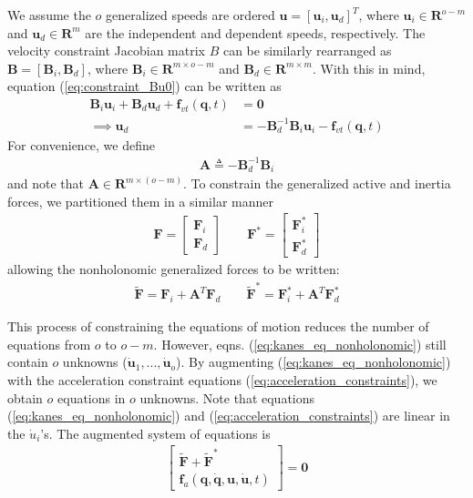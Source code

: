 \documentclass[smallcondensed,final]{svjour3}                     %
\begin{document}
We assume the $o$ generalized speeds are ordered $\mathbf{u} = [\mathbf{u}_i,
\mathbf{u}_d]^T$, where $\mathbf{u}_i\in\mathbf{R}^{o-m}$ and
$\mathbf{u}_d\in\mathbf{R}^{m}$ are the independent and dependent speeds,
respectively. The velocity constraint Jacobian matrix $B$ can be similarly
rearranged as $\mathbf{B} = [\mathbf{B}_i, \mathbf{B}_d]$, where
$\mathbf{B}_i\in \mathbf{R}^{m \times o-m}$ and $\mathbf{B}_d \in \mathbf{R}^{m
\times m}$. With this in mind, equation (\ref{eq:constraint_Bu0}) can be
written as
\begin{align}
\mathbf{B}_i \mathbf{u}_i + \mathbf{B}_d \mathbf{u}_d + \mathbf{f}_{vt}(\mathbf{q}, t) &= \mathbf{0} \\
\implies \mathbf{u}_d &= -\mathbf{B}_d^{-1} \mathbf{B}_i \mathbf{u}_i - \mathbf{f}_{vt}(\mathbf{q}, t)
\end{align}
For convenience, we define
\begin{align}
\label{eq:constraint_A}
\mathbf{A} \triangleq - \mathbf{B}_{d}^{-1} \mathbf{B}_i
\end{align}
and note that $\mathbf{A}\in\mathbf{R}^{m \times (o - m)}$. To constrain the
generalized active and inertia forces, we partitioned them in a similar
manner
\begin{align}
\label{eq:F_Fstar_rewrite}
\mathbf{F} = \begin{bmatrix} \mathbf{F}_i \\ \mathbf{F}_d \end{bmatrix} \quad
\quad \mathbf{F}^* = \begin{bmatrix} \mathbf{F}^*_i \\ \mathbf{F}^*_d
\end{bmatrix}
\end{align}
allowing the nonholonomic generalized forces to be written:
\begin{align}
\label{eq:F_Fstar_nonholonomic}
\tilde{\mathbf{F}} = \mathbf{F}_i + \mathbf{A}^T \mathbf{F}_d \quad \quad
\tilde{\mathbf{F}}^* = \mathbf{F}_i^* + \mathbf{A}^T \mathbf{F}_d^*
\end{align}

This process of constraining the equations of motion reduces the number of
equations from $o$ to $o-m$. However, eqns. (\ref{eq:kanes_eq_nonholonomic}) still
contain $o$ unknowns ($\dot{\mathbf{u}}_1,...,\dot{\mathbf{u}}_o$). By
augmenting (\ref{eq:kanes_eq_nonholonomic}) with the acceleration constraint
equations (\ref{eq:acceleration_constraints}), we obtain $o$ equations in
$o$ unknowns. Note that equations (\ref{eq:kanes_eq_nonholonomic}) and
(\ref{eq:acceleration_constraints}) are linear in the $\dot{u}_i$'s. The
augmented system of equations is
\begin{align}
\label{eq:F_Fstar_f_a}
\begin{bmatrix}
\tilde{\mathbf{F}} + \tilde{\mathbf{F}}^* \\
\mathbf{f}_a (\mathbf{q}, \dot{\mathbf{q}}, \mathbf{u}, \dot{\mathbf{u}}, t)
\end{bmatrix} = \mathbf{0}
\end{align}
\end{document}
